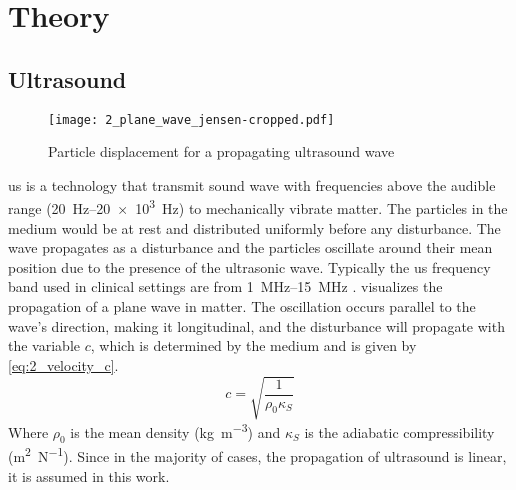 \chapter{Theory} \label{sec:theory}
\section{Ultrasound}

\begin{figure}[ht]
	\centering
	\texttt{[image: 2\_plane\_wave\_jensen-cropped.pdf]}
	\caption[Particle displacement for a propagating ultrasound wave]{Particle displacement for a propagating ultrasound wave \cite{JensenUltrasoundBook}}
	\label{fig:2_planewave_jensen}
\end{figure}

\gls{us} is a technology that transmit sound wave with frequencies above the audible range (\qtyrange[range-units = single]{20}{20e3}{\hertz}) to mechanically vibrate matter. The particles in the medium would be at rest and distributed uniformly before any disturbance. The wave propagates as a disturbance and the particles oscillate around their mean position due to the presence of the ultrasonic wave. Typically the \gls{us} frequency band used in clinical settings are from \qtyrange[range-units = single]{1}{15}{\mega\hertz} \cite{Szabo_UltrasoundBook_2}.  visualizes the propagation of a plane wave in matter. The oscillation occurs parallel to the wave's direction, making it longitudinal, and the disturbance will propagate with the variable $c$, which is determined by the medium and is given by \cref{eq:2_velocity_c}.
\begin{equation} \label{eq:2_velocity_c}
	c = \sqrt{\frac{1}{\rho_{0} \kappa_{S}}}
\end{equation}
Where $\rho_{0}$ is the mean density (\unit{\kilogram\per\meter\cubed}) and $\kappa_{S}$ is the \gls{adiabatic} compressibility (\unit{\meter\squared\per\newton}). Since in the majority of cases, the propagation of ultrasound is linear, it is assumed in this work. 

